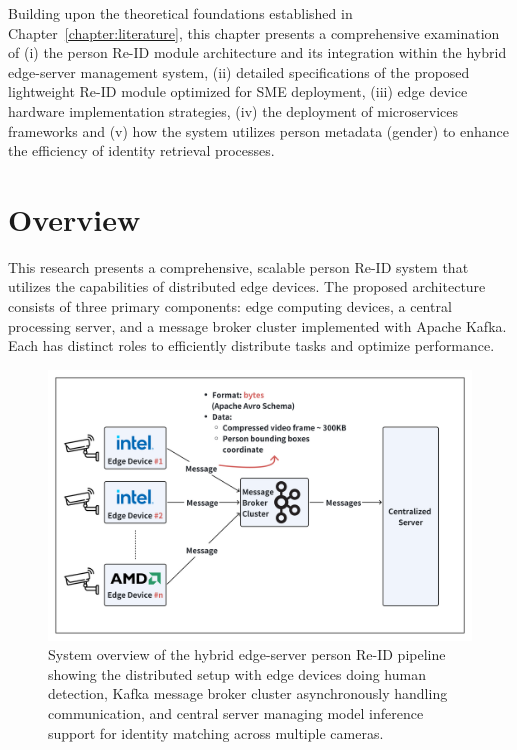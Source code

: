 \documentclass[../main.tex]{subfiles}
\begin{document}
Building upon the theoretical foundations established in Chapter~\ref{chapter:literature}, this chapter presents a comprehensive examination of (i) the person Re-ID module architecture and its integration within the hybrid edge-server management system, (ii) detailed specifications of the proposed lightweight Re-ID module optimized for SME deployment, (iii) edge device hardware implementation strategies, (iv) the deployment of microservices frameworks and (v) how the system utilizes person metadata (gender) to enhance the efficiency of identity retrieval processes.

\section{Overview}
\label{sec:overview}

This research presents a comprehensive, scalable person Re-ID system that utilizes the capabilities of distributed edge devices. The proposed architecture consists of three primary components: edge computing devices, a central processing server, and a message broker cluster implemented with Apache Kafka. Each has distinct roles to efficiently distribute tasks and optimize performance.

\begin{figure}[htbp]
    \centering
    \includegraphics[width=1\textwidth]{Figure/system_overview.png}
    \caption{System overview of the hybrid edge-server person Re-ID pipeline showing the distributed setup with edge devices doing human detection, Kafka message broker cluster asynchronously handling communication, and central server managing model inference support for identity matching across multiple cameras.}
    \label{fig:system_overview}
\end{figure}
\end{document}
